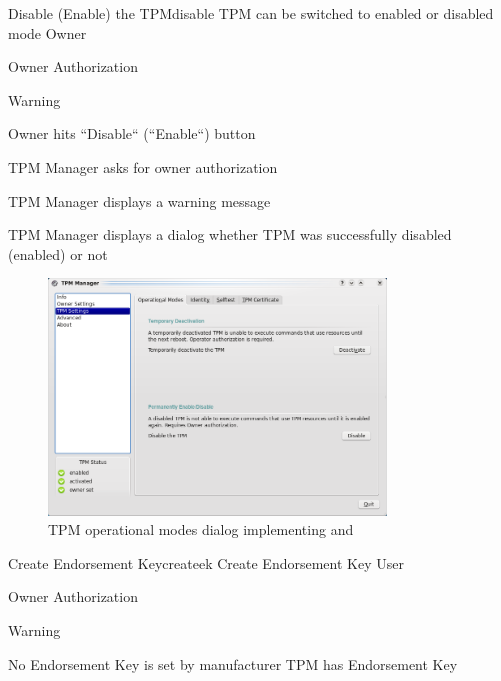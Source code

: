 \documentclass[
  american        %
]{sirrixreport}
\begin{document}
\begin{usecase}{Disable (Enable) the TPM}{disable}
\ucdesc TPM can be switched to enabled or disabled mode
\ucactors  Owner
\ucinclude 
   \begin{compactitem}
      \item Owner Authorization 
      \item Warning 
   \end{compactitem}
\ucnormal 
 \item Owner hits ``Disable`` (``Enable``) button
 \item TPM Manager asks for owner authorization 
 \item TPM Manager displays a warning message 
 \item TPM Manager displays a dialog whether TPM was successfully disabled (enabled) or not 
\ucendflow
\end{usecase}

\begin{figure}[h]
 \centering
 \includegraphics[width=0.8\textwidth]{images/tpm_operational}
 \caption{TPM operational modes dialog implementing  and }
\end{figure}
\clearpage


\begin{usecase}{Create Endorsement Key}{createek}
\ucdesc Create Endorsement Key
\ucactors  User
\ucinclude 
   \begin{compactitem}
      \item Owner Authorization 
      \item Warning 
   \end{compactitem}
\ucprecond No Endorsement Key is set by manufacturer
\ucpostcond TPM has Endorsement Key
\end{usecase}
\end{document}
